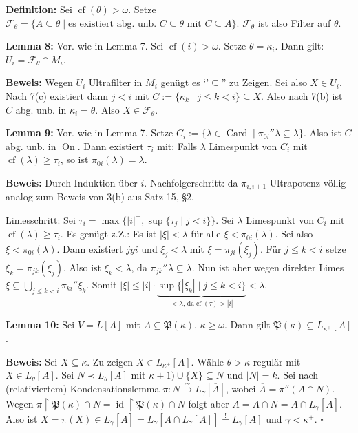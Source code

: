 \documentclass[a4paper,fontsize=11pt]{scrartcl}
\newcommand{\Card}{\operatorname{Card}}
\newcommand{\On}{\operatorname{On}}
\newcommand{\cf}{\operatorname{cf}}
\newcommand{\id}{\operatorname{id}}
\renewcommand{\bar}[1]{\overline{#1}}
\begin{document}

{\bf Definition:} Sei $\cf(\theta)>\omega$.
	Setze $\mathcal F_{\theta}=\{A\subseteq\theta\mid \mbox{es existiert abg. unb. $C\subseteq\theta$ mit $C\subseteq A\}$}$.
	$\mathcal F_{\theta}$ ist also Filter auf $\theta$.

{\bf Lemma 8:} Vor. wie in Lemma 7.
	Sei $\cf(i)>\omega$.
	Setze $\theta=\kappa_i$.
	Dann gilt: $U_i=\mathcal F_{\theta}\cap M_i$.

	{\bf Beweis:} Wegen $U_i$ Ultrafilter in $M_i$ genügt es `'$\subseteq$'' zu Zeigen.
		Sei also $X\in U_i$.
		Nach 7(c) existiert dann $j<i$ mit $C:= \{\kappa_k\mid j\le k<i\}\subseteq X$.
		Also nach 7(b) ist $C$ abg. unb. in $\kappa_i=\theta$.
		Also $X\in \mathcal F_{\theta}$.

{\bf Lemma 9:} Vor. wie in Lemma 7.
	Setze $C_i:=\{\lambda\in\Card\mid \pi_{0i}''\lambda\subseteq\lambda\}$.
	Also ist $C$ abg. unb. in $\On$.
	Dann existiert $\tau_i$ mit:
	Falls $\lambda$ Limespunkt von $C_i$ mit $\cf(\lambda)\ge\tau_i$, so ist $\pi_{0i}(\lambda)=\lambda$.

	{\bf Beweis:} Durch Induktion über $i$.
		Nachfolgerschritt: da $\pi_{i,i+1}$ Ultrapotenz völlig analog zum Beweis von 3(b) aus Satz 15, §2.

		Limesschritt: Sei $\tau_i=\max\{|i|^+,\sup\{\tau_j\mid j<i\}\}$. %
		Sei $\lambda$ Limespunkt von $C_i$ mit $\cf(\lambda)\ge\tau_i$.
		Es genügt z.Z.: Es ist $|\xi|<\lambda$ für alle $\xi<\pi_{0i}(\lambda)$.
		Sei also $\xi<\pi_{0i}(\lambda)$.
		Dann existiert $jyi$ und $\xi_j<\lambda$ mit $\xi=\pi_{ji}(\xi_j)$.
		Für $j\le k<i$ setze $\xi_k=\pi_{jk}(\xi_j)$.
		Also ist $\xi_k<\lambda$, da $\pi_{jk}''\lambda\subseteq\lambda$.
		Nun ist aber wegen direkter Limes $\xi\subseteq \bigcup_{j\le k<i}\pi_{ki}''\xi_k$.
		Somit $|\xi|\le|i|\cdot\underbrace{\sup\{|\xi_k|\mid j\le k<i\}}_{<\lambda\mbox{, da} \cf(\tau)>|i|}<\lambda$.


{\bf Lemma 10:} Sei $V=L[A]$ mit $A\subseteq\mathfrak{P}(\kappa)$, $\kappa\ge\omega$. Dann gilt $\mathfrak{P}(\kappa)\subseteq L_{\kappa^+}[A]$.

   {\bf Beweis:} Sei $X\subseteq\kappa$. Zu zeigen $X\in L_{\kappa^+}[A]$. Wähle $\theta>\kappa$ regulär mit $X\in L_\theta[A]$. Sei $N\prec
   L_\theta[A]$ mit $\kappa+1)\cup\{X\}\subseteq N$ und $|N|=k$. Sei nach (relativiertem) Kondensationslemma
   $\pi:N\xrightarrow{\sim}L_\gamma[\bar{A}]$, wobei $\bar{A}=\pi''(A\cap N)$. Wegen $\pi\upharpoonright\mathfrak{P}(\kappa)\cap N =
   \id\upharpoonright\mathfrak{P}(\kappa)\cap N$ folgt aber $\bar{A}=A\cap N=A\cap L_\gamma[\bar{A}]$. Also ist $X=\pi(X)\in L_\gamma[\bar{A}] =
   L_\gamma[A\cap L_\gamma[A]] \stackrel{!}{=} L_\gamma[A]$ und $\gamma<\kappa^+$. \hfill $\square$
\end{document}
